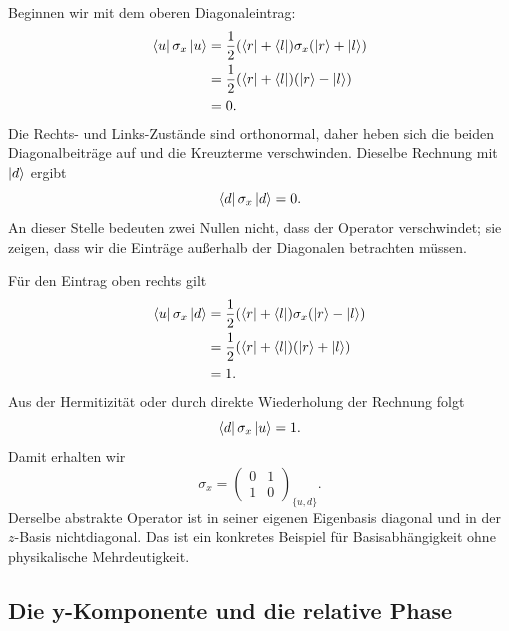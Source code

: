 Beginnen wir mit dem oberen Diagonaleintrag:
\begin{align}
\left\langle u\right\rvert\sigma_x\left\lvert u\right\rangle
 &=\frac12(\left\langle r\right\rvert+\left\langle l\right\rvert)\sigma_x(\left\lvert r\right\rangle+\left\lvert l\right\rangle)\\
 &=\frac12(\left\langle r\right\rvert+\left\langle l\right\rvert)(\left\lvert r\right\rangle-\left\lvert l\right\rangle)\\
 &=0.
\end{align}
Die Rechts- und Links-Zustände sind orthonormal, daher heben sich die beiden Diagonalbeiträge auf und die Kreuzterme verschwinden. Dieselbe Rechnung mit \(\left\lvert d\right\rangle\) ergibt
\[
\left\langle d\right\rvert\sigma_x\left\lvert d\right\rangle=0.
\]
An dieser Stelle bedeuten zwei Nullen nicht, dass der Operator verschwindet; sie zeigen, dass wir die Einträge außerhalb der Diagonalen betrachten müssen.

Für den Eintrag oben rechts gilt
\begin{align}
\left\langle u\right\rvert\sigma_x\left\lvert d\right\rangle
 &=\frac12(\left\langle r\right\rvert+\left\langle l\right\rvert)\sigma_x(\left\lvert r\right\rangle-\left\lvert l\right\rangle)\\
 &=\frac12(\left\langle r\right\rvert+\left\langle l\right\rvert)(\left\lvert r\right\rangle+\left\lvert l\right\rangle)\\
 &=1.
\end{align}
Aus der Hermitizität oder durch direkte Wiederholung der Rechnung folgt
\[
\left\langle d\right\rvert\sigma_x\left\lvert u\right\rangle=1.
\]
Damit erhalten wir
\begin{equation}
\boxed{
\sigma_x=
\begin{pmatrix}
0&1\\
1&0
\end{pmatrix}_{\{u,d\}}.}
\label{eq:sigma-x}
\end{equation}
Derselbe abstrakte Operator ist in seiner eigenen Eigenbasis diagonal und in der \(z\)-Basis nichtdiagonal. Das ist ein konkretes Beispiel für Basisabhängigkeit ohne physikalische Mehrdeutigkeit.

\subsection{Die y-Komponente und die relative Phase}

